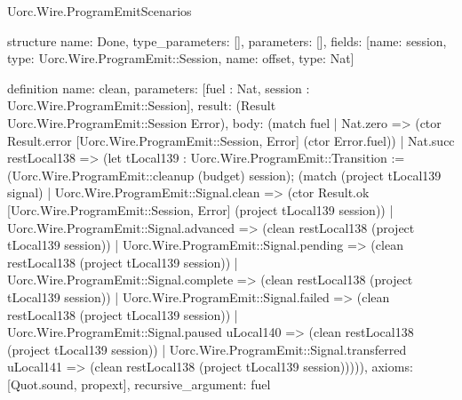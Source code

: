 \begin{lexlean}{Uorc.Wire.ProgramEmitScenarios}
\begin{semanticmodule}
structure{
  name: Done,
  type_parameters: [],
  parameters: [],
  fields: [{name: session, type: Uorc.Wire.ProgramEmit::Session}, {name: offset, type: Nat}]
}

definition{
  name: clean,
  parameters: [fuel : Nat, session : Uorc.Wire.ProgramEmit::Session],
  result: (Result Uorc.Wire.ProgramEmit::Session Error),
  body: (match fuel
    | Nat.zero => (ctor Result.error [Uorc.Wire.ProgramEmit::Session, Error] (ctor Error.fuel))
    | Nat.succ restLocal138 => (let tLocal139 : Uorc.Wire.ProgramEmit::Transition := (Uorc.Wire.ProgramEmit::cleanup (budget) session); (match (project tLocal139 signal)
      | Uorc.Wire.ProgramEmit::Signal.clean => (ctor Result.ok [Uorc.Wire.ProgramEmit::Session, Error] (project tLocal139 session))
      | Uorc.Wire.ProgramEmit::Signal.advanced => (clean restLocal138 (project tLocal139 session))
      | Uorc.Wire.ProgramEmit::Signal.pending => (clean restLocal138 (project tLocal139 session))
      | Uorc.Wire.ProgramEmit::Signal.complete => (clean restLocal138 (project tLocal139 session))
      | Uorc.Wire.ProgramEmit::Signal.failed => (clean restLocal138 (project tLocal139 session))
      | Uorc.Wire.ProgramEmit::Signal.paused uLocal140 => (clean restLocal138 (project tLocal139 session))
      | Uorc.Wire.ProgramEmit::Signal.transferred uLocal141 => (clean restLocal138 (project tLocal139 session))))),
  axioms: [Quot.sound, propext],
  recursive_argument: fuel
}


\end{semanticmodule}
\end{lexlean}
